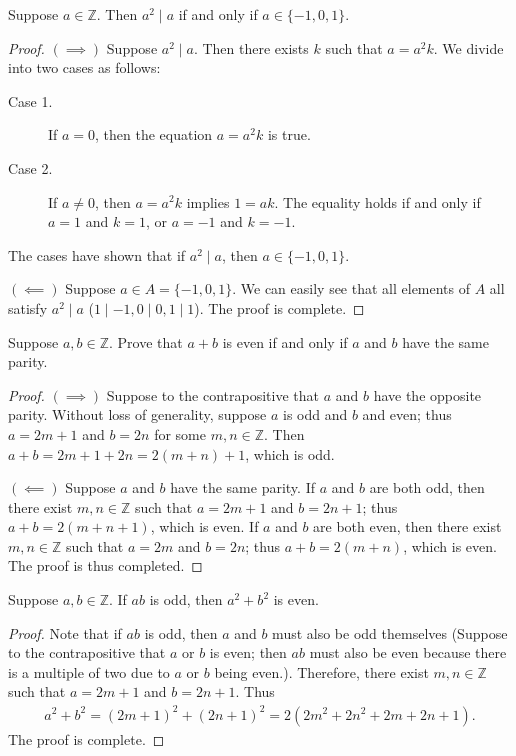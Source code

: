 \documentclass{exam}
\begin{document}
\begin{proposition}{7.14}
    Suppose $a\in\mathbb Z$. Then $a^2\mid a$ if and only if $a\in\{-1,0,1\}$.
\end{proposition}

\begin{proof}
    $(\implies)$ Suppose $a^2 \mid a$. Then there exists $k$ such that $a = a^2k$. We divide into two cases as follows:
    \begin{description}
        \item[Case 1. ] If $a = 0$, then the equation $a=a^2k$ is true.
        \item[Case 2. ] If $a\neq 0$, then $a=a^2k$ implies $1=ak$. The equality holds if and only if $a = 1$ and $k = 1$, or $a = -1$ and $k = -1$.
    \end{description}
    The cases have shown that if $a^2 \mid a$, then $a \in\{-1,0,1\}$.

    $(\impliedby)$ Suppose $a\in A=\{-1, 0, 1\}$. We can easily see that all elements of $A$ all satisfy $a^2 \mid a$ ($1\mid -1,0\mid0, 1\mid 1$). The proof is complete.
\end{proof}

\begin{proposition}{7.15}
    Suppose $a, b\in\mathbb Z$. Prove that $a+b$ is even if and only if $a$ and $b$ have the same parity.
\end{proposition}

\begin{proof}
    $(\implies)$ Suppose to the contrapositive that $a$ and $b$ have the opposite parity. Without loss of generality, suppose $a$ is odd and $b$ and even; thus $a = 2m + 1$ and $b = 2n$ for some $m,n\in\mathbb Z$. Then $a + b = 2m + 1 + 2n = 2(m+n)+1$, which is odd.

    $(\impliedby)$ Suppose $a$ and $b$ have the same parity. If $a$ and $b$ are both odd, then there exist $m,n\in\mathbb Z$ such that $a  =2m + 1$ and $b = 2n + 1$; thus $a + b = 2(m+n+1)$, which is even. If $a$ and $b$ are both even, then there exist $m,n\in\mathbb Z$ such that $a=2m$ and $b=2n$; thus $a + b = 2(m+n)$, which is even. The proof is thus completed.
\end{proof}

\begin{proposition}{7.16}
    Suppose $a,b\in\mathbb Z$. If $ab$ is odd, then $a^2 + b^2$ is even.
\end{proposition}

\begin{proof}
    Note that if $ab$ is odd, then $a$ and $b$ must also be odd themselves (Suppose to the contrapositive that $a$ or $b$ is even; then $ab$ must also be even because there is a multiple of two due to $a$ or $b$ being even.). Therefore, there exist $m,n\in\mathbb Z$ such that $a = 2m +1$ and $b=2n+1$. Thus
    \begin{align*}
        a^2+b^2=(2m+1)^2+(2n+1)^2=2(2m^2+2n^2+2m+2n+1).
    \end{align*}
    The proof is complete.
\end{proof}
\end{document}
